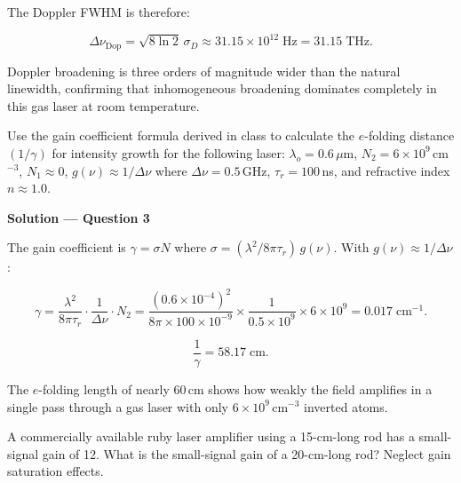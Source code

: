 The Doppler FWHM is therefore:

\begin{equation*}
  \boxed{\Delta\nu_\text{Dop} = \sqrt{8\ln 2}\,\sigma_D \approx 31.15\times10^{12}\;\text{Hz} = 31.15\;\text{THz.}}
\end{equation*}

Doppler broadening is three orders of magnitude wider than the natural linewidth, confirming that inhomogeneous broadening dominates completely in this gas laser at room temperature.


\begin{question}[Question 3]Use the gain coefficient formula derived in class to calculate the
$e$-folding distance $(1/\gamma)$ for intensity growth for the following laser:
$\lambda_{o}=0.6\,\mu$m, $N_{2}=6\times10^{9}$\,cm$^{-3}$, $N_{1}\approx 0$,
$g(\nu)\approx1/\Delta\nu$ where $\Delta\nu=0.5$\,GHz, $\tau_{r}=100$\,ns, and refractive
index $n\approx 1.0$.
\end{question}

\textbf{\large Solution --- Question 3}

The gain coefficient is $\gamma = \sigma N$ where $\sigma = (\lambda^{2}/8\pi\tau_r)\,g(\nu)$. With $g(\nu)\approx1/\Delta\nu$:

\begin{equation*}
  \gamma = \frac{\lambda^{2}}{8\pi\tau_r}\cdot\frac{1}{\Delta\nu}\cdot N_2
  = \frac{(0.6\times10^{-4})^{2}}{8\pi\times100\times10^{-9}}\times\frac{1}{0.5\times10^{9}}\times6\times10^{9}
  = 0.017\;\text{cm}^{-1}.
\end{equation*}

\begin{equation*}
  \boxed{\frac{1}{\gamma} = 58.17\;\text{cm.}}
\end{equation*}

The $e$-folding length of nearly 60\,cm shows how weakly the field amplifies in a single pass through a gas laser with only $6\times10^9$\,cm$^{-3}$ inverted atoms.


\begin{question}[Question 4]A commercially available ruby laser amplifier using a 15-cm-long rod has a
small-signal gain of 12. What is the small-signal gain of a 20-cm-long rod? Neglect gain
saturation effects.
\end{question}

